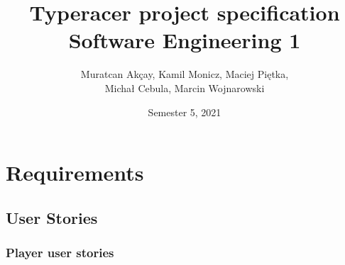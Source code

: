 \documentclass{article}
\title{Typeracer project specification \\ \large Software Engineering 1}
\author{Muratcan Akçay, Kamil Monicz, Maciej Piętka,\\ Michał Cebula, Marcin Wojnarowski}
\date{Semester 5, 2021}
\begin{document}
\maketitle

\tableofcontents

\section{Requirements}

\subsection{User Stories}

\subsubsection{Player user stories}
\end{document}
